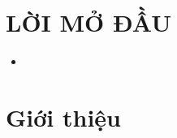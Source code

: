 

\newcommand{\tab}{\hspace{\parindent}}

\begin{titlepage}
\bordertitle
\begin{center}
\vspace{\fill} \maintitle \\ \vspace{\fill} \bottitle
\end{center}
\end{titlepage}
\newpage
{}
\tableofcontents
\thispagestyle{empty}
\newpage
\chapter*{ LỜI MỞ ĐẦU }
\thispagestyle{empty}
\vspace{\fill}
\begin{itemize}
\item 
\end{itemize}
\vspace{\fill}
\newpage
\setcounter{page}{1}
\chapter{ Giới thiệu }


